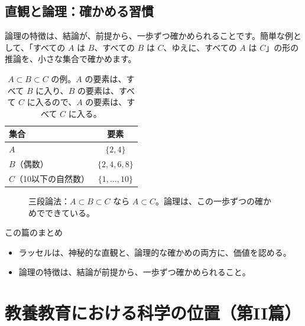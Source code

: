 \documentclass[a4paper,11pt,openany]{ltjsbook}
\begin{document}
\section{直観と論理：確かめる習慣}

論理の特徴は、結論が、前提から、一歩ずつ確かめられることです。簡単な例として、「すべての $A$ は $B$、すべての $B$ は $C$、ゆえに、すべての $A$ は $C$」の形の推論を、小さな集合で確かめます。

\begin{table}[htbp]
\centering
\begin{tabular}{lc}
\toprule
集合 & 要素\\
\midrule
$A$ & $\{2,4\}$\\
$B$（偶数） & $\{2,4,6,8\}$\\
$C$（10以下の自然数） & $\{1,\ldots,10\}$\\
\bottomrule
\end{tabular}
\caption{$A\subset B\subset C$ の例。$A$ の要素は、すべて $B$ に入り、$B$ の要素は、すべて $C$ に入るので、$A$ の要素は、すべて $C$ に入る。}
\end{table}

\begin{figure}[htbp]
\centering
{}
\caption{三段論法：$A\subset B\subset C$ なら $A\subset C$。論理は、この一歩ずつの確かめでできている。}
\end{figure}

\begin{pointbox}{この篇のまとめ}
\begin{itemize}[leftmargin=*]
\item ラッセルは、神秘的な直観と、論理的な確かめの両方に、価値を認める。
\item 論理の特徴は、結論が前提から、一歩ずつ確かめられること。
\end{itemize}
\end{pointbox}

\chapter{教養教育における科学の位置（第II篇）}
\end{document}

